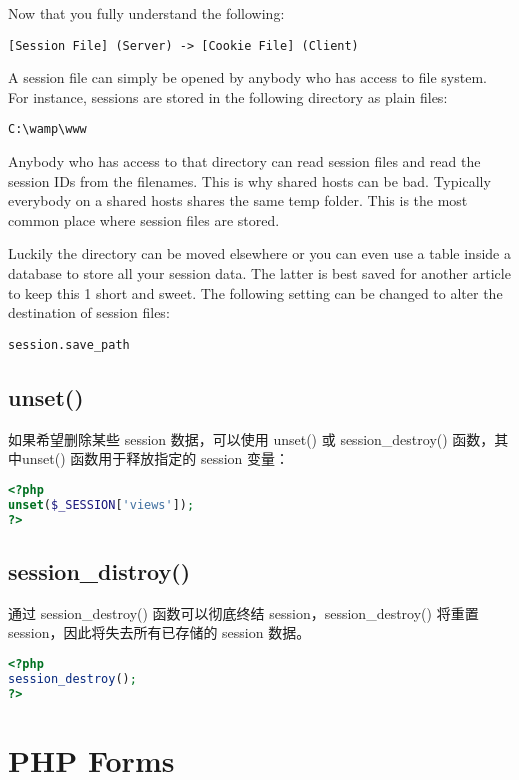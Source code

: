Now that you fully understand the following:

\verb|[Session File] (Server) -> [Cookie File] (Client)|

A session file can simply be opened by anybody who has access to file system. For instance, sessions are stored in the following directory as plain files:

\verb|C:\wamp\www|

Anybody who has access to that directory can read session files and read the session IDs from the filenames. This is why shared hosts can be bad. Typically everybody on a shared hosts shares the same temp folder. This is the most common place where session files are stored. 

Luckily the directory can be moved elsewhere or you can even use a table inside a database to store all your session data. The latter is best saved for another article to keep this 1 short and sweet. The following setting can be changed to alter the destination of session files:

\verb|session.save_path|

\section{unset()}

如果希望删除某些 session 数据，可以使用 unset() 或 session\_destroy() 函数，其中unset() 函数用于释放指定的 session 变量：


\begin{lstlisting}[language=PHP]
<?php
unset($_SESSION['views']);
?>
\end{lstlisting}



\section{session\_distroy()}




通过 session\_destroy() 函数可以彻底终结 session，session\_destroy() 将重置 session，因此将失去所有已存储的 session 数据。


\begin{lstlisting}[language=PHP]
<?php
session_destroy();
?>
\end{lstlisting}



\chapter{PHP Forms}

